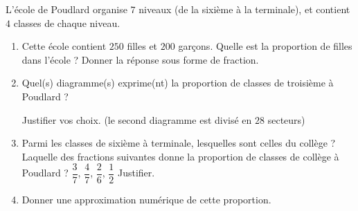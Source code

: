 
\begin{exercice}\label{exosmath-0888}

    L'école de Poudlard organise \( 7\) niveaux (de la sixième à la terminale), et contient \( 4\) classes de chaque niveau. 
    
    \begin{enumerate}
        \item
            Cette école contient \( 250\) filles et \( 200\) garçons. Quelle est la proportion de filles dans l'école ? Donner la réponse sous forme de fraction.
        \item
            
    Quel(s) diagramme(s) exprime(nt) la proportion de classes de troisième à Poudlard ?

\begin{center}
   
   
   
\end{center}
Justifier vos choix. (le second diagramme est divisé en \( 28\) secteurs)
\item
    Parmi les classes de sixième à terminale, lesquelles sont celles du collège ? Laquelle des fractions suivantes donne la proportion de classes de collège à Poudlard ?  \( \dfrac{ 3 }{ 7 }\), \( \dfrac{ 4 }{ 7 }\), \( \dfrac{ 2 }{ 6 }\), \( \dfrac{ 1 }{ 2 }\) Justifier.

\item
    Donner une approximation numérique de cette proportion.
    \end{enumerate}

\end{exercice}
